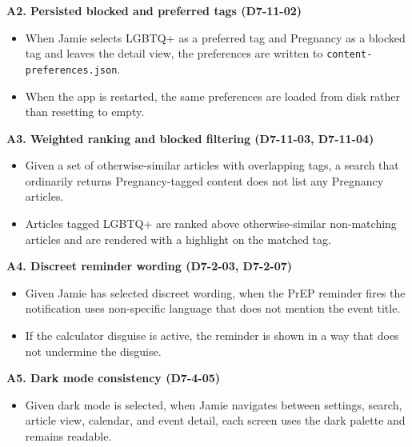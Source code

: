 \documentclass[a4paper, 12pt]{article}
\begin{document}
    \textbf{A2. Persisted blocked and preferred tags (D7-11-02)}

    \begin{itemize}
        \item When Jamie selects LGBTQ+ as a preferred tag and Pregnancy as a
            blocked tag and leaves the detail view, the preferences are written to
            \texttt{content-preferences.json}.

        \item When the app is restarted, the same preferences are loaded from
            disk rather than resetting to empty.
    \end{itemize}

    \textbf{A3. Weighted ranking and blocked filtering (D7-11-03, D7-11-04)}

    \begin{itemize}
        \item Given a set of otherwise-similar articles with overlapping tags, a
            search that ordinarily returns Pregnancy-tagged content does not
            list any Pregnancy articles.

        \item Articles tagged LGBTQ+ are ranked above otherwise-similar non-matching
            articles and are rendered with a highlight on the matched tag.
    \end{itemize}

    \textbf{A4. Discreet reminder wording (D7-2-03, D7-2-07)}

    \begin{itemize}
        \item Given Jamie has selected discreet wording, when the PrEP reminder
            fires the notification uses non-specific language that does not
            mention the event title.

        \item If the calculator disguise is active, the reminder is shown in a
            way that does not undermine the disguise.
    \end{itemize}

    \textbf{A5. Dark mode consistency (D7-4-05)}

    \begin{itemize}
        \item Given dark mode is selected, when Jamie navigates between settings,
            search, article view, calendar, and event detail, each screen uses the
            dark palette and remains readable.
    \end{itemize}
\end{document}
